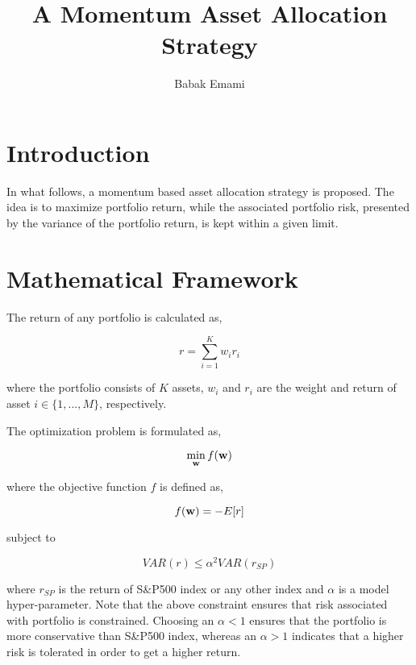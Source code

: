\documentclass{article}
\title{A Momentum Asset Allocation Strategy}
\author{Babak Emami}
\begin{document}
\maketitle

\section{Introduction}\label{section:introduction}

In what follows, a momentum based asset allocation strategy is
proposed. The idea is to maximize portfolio return, while the
associated portfolio risk, presented by the variance of the portfolio
return, is kept within a given limit.

\section{Mathematical Framework}
\label{section:framework}

The return of any portfolio is calculated as,

\begin{equation}\label{eqn:port-return}
  r = \sum_{i=1}^{K} w_i r_i
\end{equation}

where the portfolio consists of $K$ assets, $w_i$ and $r_i$ are the
weight and return of asset $i \in \{1,...,M\}$, respectively.

The optimization problem is formulated as,

\begin{equation}\label{eqn:objective-func-1}
  \min_{{\bf{w}}} f({\bf{w}}) 
\end{equation}

where the objective function $f$ is defined as,

\begin{equation}\label{eqn:objective-func-1}
  f({\bf{w}}) = -E[r]
\end{equation}

subject to

\begin{equation}\label{eqn:constraints-1}
  VAR(r) \le \alpha^2 VAR(r_{SP})
\end{equation}

where $r_{SP}$ is the return of S\&P500 index or any other index and
$\alpha$ is a model hyper-parameter. Note that the above constraint
ensures that risk associated with portfolio is constrained. Choosing
an $\alpha < 1$ ensures that the portfolio is more conservative than
S\&P500 index, whereas an $\alpha > 1$ indicates that a higher risk
is tolerated in order to get a higher return.
\end{document}
